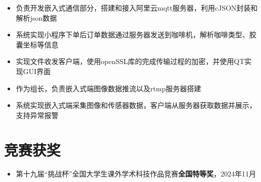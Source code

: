 \documentclass{resume}
\begin{document}
\begin{itemize}
    \item 负责开发嵌入式通信部分，搭建和接入阿里云mqtt服务器，利用cJSON封装和解析json数据
    \item 系统实现小程序下单后订单数据通过服务器发送到咖啡机，解析咖啡类型、胶囊坐标等信息
\end{itemize}

\begin{itemize}
    \item 实现文件收发客户端，使用openSSL库的完成传输过程的加密，并使用QT实现GUI界面
\end{itemize}

\begin{itemize}
    \item 作为组长，负责嵌入式端图像数据推流以及rtmp服务器搭建
    \item 系统实现嵌入式端采集图像和传感器数据，客户端从服务器获取数据并展示，支持异常报警
    
\end{itemize}

\section{竞赛获奖}
\begin{itemize}[parsep=0.2ex]
  \item 第十九届“挑战杯”全国大学生课外学术科技作品竞赛\textbf{全国特等奖}，2024年11月
\end{itemize}

%
%
\end{document}
